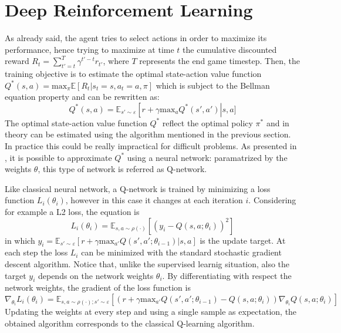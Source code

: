 \documentclass[article,11pt]{article}
\begin{document}
	\section{Deep Reinforcement Learning}
	As already said, the agent tries to select actions in order to maximize its performance, hence trying to maximize at time $t$ the cumulative discounted reward $R_t = \sum_{t'=t}^{T}\gamma^{t'-t}r_{t'}$, where $T$ represents the end game timestep. Then, the training objective is to estimate the optimal state-action value function $Q^*(s,a) =\text{max}_\pi \mathbb{E}\left[R_t | s_t=s, a_t=a, \pi\right]$ which is subject to the Bellman equation property and can be rewritten as:
	\begin{equation}
		Q^*(s,a) = \mathbb{E}_{s'\sim\varepsilon}\left[r + \gamma \text{max}_{a}Q^*(s',a')\right | s, a]
	\end{equation} 
	The optimal state-action value function $Q^*$ reflect the optimal policy $\pi^*$ and in theory can be estimated using the algorithm mentioned in the previous section. In practice this could be really impractical for difficult problems.
	As presented in \cite{dqn2013}, it is possible to approximate $Q^*$ using a neural network: paramatrized by the weights $\theta$, this type of network is referred as Q-network.
	
	Like classical neural network, a Q-network is trained by minimizing a loss function $L_i(\theta_i)$, however in this case it changes at each iteration $i$. Considering for example a L2 loss, the equation is
	\begin{equation}
		L_i(\theta_i) = \mathbb{E}_{s,a\sim\rho(\cdot)} \left[ (y_i - Q(s,a;\theta_i))^2 \right]
		\label{lossdqn}
	\end{equation}
	in which $y_i=\mathbb{E}_{s'\sim\varepsilon} \left[ r+ \gamma \text{max}_{a'}Q(s',a';\theta_{i-1})|s,a \right]$ is the update target.
	At each step the loss $L_i$ can be minimized with the standard stochastic gradient descent algorithm. Notice that, unlike the supervised learnig situation, also the target $y_i$ depends on the network weights $\theta_i$. By differentiating with respect the network weights, the gradient of the loss function is
	\begin{equation}
		\nabla_{\theta_i} L_i(\theta_i) = \mathbb{E}_{s,a\sim\rho(\cdot);s'\sim\varepsilon} \left[ \left( r+\gamma \text{max}_{a'}Q(s',a';\theta_{i-1}) - Q(s,a;\theta_i) \right) \nabla_{\theta_i} Q(s,a;\theta_i) \right]
	\end{equation}
	Updating the weights at every step and using a single sample as expectation, the obtained algorithm corresponds to the classical Q-learning algorithm.\\
	
\end{document}
